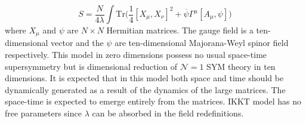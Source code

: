 \documentclass[11pt]{article}
\begin{document}
\begin{equation}
	\label{eq:IKKT} 
S = \frac{N}{4\lambda} \int \mbox{Tr} \Big( \frac{1}{4} [X_\mu, X_\nu]^{2} + \overline{\psi} \Gamma^{\mu} [A_{\mu},\psi] \Big) 
\end{equation}
where $X_{\mu}$ and $\psi$ are $N \times N$ Hermitian matrices. The gauge field is a ten-dimensional vector and the $\psi$ are ten-dimensional Majorana-Weyl spinor field respectively. This model in zero dimensions possess no usual space-time supersymmetry 
but is dimensional reduction of $\mathcal{N}=1$ SYM theory in ten dimensions. 
It is expected that in this model both space and time should be dynamically generated as a result of the dynamics of the large matrices. 
The space-time is expected to emerge entirely from the matrices. 
IKKT model has no free parameters since $\lambda$ can be absorbed in the 
field redefinitions. 
\end{document}

